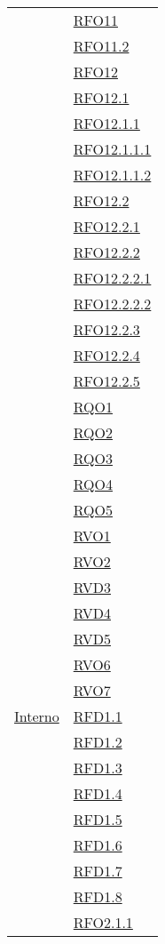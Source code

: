 \begin{longtable}{|>{\centering}m{5cm}|m{5cm}<{\centering}|}
& \hyperlink{RFO11}{RFO11}\\
& \hyperlink{RFO11.1}{RFO11.2}\\
& \hyperlink{RFO12}{RFO12}\\
& \hyperlink{RFO12.1}{RFO12.1}\\
& \hyperlink{RFO12.1.1}{RFO12.1.1}\\
& \hyperlink{RFO12.1.1.1}{RFO12.1.1.1}\\
& \hyperlink{RFO12.1.1.2}{RFO12.1.1.2}\\
& \hyperlink{RFO12.2}{RFO12.2}\\
& \hyperlink{RFO12.2.1}{RFO12.2.1}\\
& \hyperlink{RFO12.2.2}{RFO12.2.2}\\
& \hyperlink{RFO12.2.2.1}{RFO12.2.2.1}\\
& \hyperlink{RFO12.2.2.2}{RFO12.2.2.2}\\
& \hyperlink{RFO12.2.3}{RFO12.2.3}\\
& \hyperlink{RFO12.2.4}{RFO12.2.4}\\
& \hyperlink{RFO12.2.5}{RFO12.2.5}\\
& \hyperlink{RQO1}{RQO1}\\
& \hyperlink{RQO2}{RQO2}\\
& \hyperlink{RQO3}{RQO3}\\
& \hyperlink{RQO4}{RQO4}\\
& \hyperlink{RQO5}{RQO5}\\
& \hyperlink{RVO1}{RVO1}\\
& \hyperlink{RVO2}{RVO2}\\
& \hyperlink{RVD3}{RVD3}\\
& \hyperlink{RVD4}{RVD4}\\
& \hyperlink{RVD5}{RVD5}\\
& \hyperlink{RVO6}{RVO6}\\
& \hyperlink{RVO7}{RVO7}\\ \hline
\hyperlink{Interno}{Interno} & \hyperlink{RFD1.1}{RFD1.1}\\
& \hyperlink{RFD1.2}{RFD1.2}\\
& \hyperlink{RFO1.3}{RFD1.3}\\
& \hyperlink{RFO1.4}{RFD1.4}\\
& \hyperlink{RFO1.5}{RFD1.5}\\
& \hyperlink{RFO1.6}{RFD1.6}\\
& \hyperlink{RFO1.7}{RFD1.7}\\
& \hyperlink{RFF1.8}{RFD1.8}\\
& \hyperlink{RFO2.1.1}{RFO2.1.1}\\

\end{longtable}
